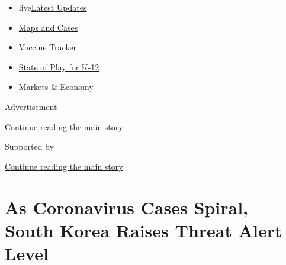 \begin{itemize}
\tightlist
\item
  live\href{https://www.nytimes3xbfgragh.onion/2020/08/17/world/coronavirus-covid.html?name=styln-coronavirus-national\&region=TOP_BANNER\&variant=undefined\&block=storyline_menu_recirc\&action=click\&pgtype=Article\&impression_id=0d975c01-e109-11ea-a073-25c439efb2c1}{Latest
  Updates}
\item
  \href{https://www.nytimes3xbfgragh.onion/interactive/2020/us/coronavirus-us-cases.html?name=styln-coronavirus-national\&region=TOP_BANNER\&variant=undefined\&block=storyline_menu_recirc\&action=click\&pgtype=Article\&impression_id=0d975c02-e109-11ea-a073-25c439efb2c1}{Maps
  and Cases}
\item
  \href{https://www.nytimes3xbfgragh.onion/interactive/2020/science/coronavirus-vaccine-tracker.html?name=styln-coronavirus-national\&region=TOP_BANNER\&variant=undefined\&block=storyline_menu_recirc\&action=click\&pgtype=Article\&impression_id=0d978310-e109-11ea-a073-25c439efb2c1}{Vaccine
  Tracker}
\item
  \href{https://www.nytimes3xbfgragh.onion/2020/08/17/us/k-12-schools-reopening.html?name=styln-coronavirus-national\&region=TOP_BANNER\&variant=undefined\&block=storyline_menu_recirc\&action=click\&pgtype=Article\&impression_id=0d978311-e109-11ea-a073-25c439efb2c1}{State
  of Play for K-12}
\item
  \href{https://www.nytimes3xbfgragh.onion/live/2020/08/17/business/stock-market-today-coronavirus?name=styln-coronavirus-national\&region=TOP_BANNER\&variant=undefined\&block=storyline_menu_recirc\&action=click\&pgtype=Article\&impression_id=0d978312-e109-11ea-a073-25c439efb2c1}{Markets
  \& Economy}
\end{itemize}

Advertisement

\protect\hyperlink{after-top}{Continue reading the main story}

Supported by

\protect\hyperlink{after-sponsor}{Continue reading the main story}

\hypertarget{as-coronavirus-cases-spiral-south-korea-raises-threat-alert-level}{%
\section{As Coronavirus Cases Spiral, South Korea Raises Threat Alert
Level}\label{as-coronavirus-cases-spiral-south-korea-raises-threat-alert-level}}

